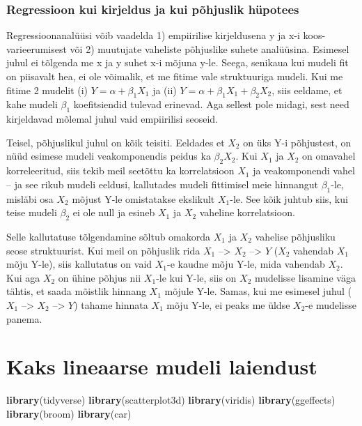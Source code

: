 \documentclass[]{book}
\newenvironment{Shaded}{\begin{snugshade}}{\end{snugshade}}
\newcommand{\KeywordTok}[1]{\textcolor[rgb]{0.13,0.29,0.53}{\textbf{#1}}}
\newcommand{\NormalTok}[1]{#1}
\begin{document}
\subsection*{Regressioon kui kirjeldus ja kui põhjuslik
hüpotees}\label{regressioon-kui-kirjeldus-ja-kui-pohjuslik-hupotees}

Regressioonanalüüsi võib vaadelda 1) empiirilise kirjeldusena y ja x-i
koos-varieerumisest või 2) muutujate vaheliste põhjuslike suhete
analüüsina. Esimesel juhul ei tõlgenda me x ja y suhet x-i mõjuna y-le.
Seega, senikaua kui mudeli fit on piisavalt hea, ei ole võimalik, et me
fitime vale struktuuriga mudeli. Kui me fitime 2 mudelit (i)
\(Y = \alpha + \beta_1X_1\) ja (ii)
\(Y = \alpha + \beta_1X_1 + \beta_2X_2\), siis eeldame, et kahe mudeli
\(\beta_1\) koefitsiendid tulevad erinevad. Aga sellest pole midagi,
sest need kirjeldavad mõlemal juhul vaid empiirilisi seoseid.

Teisel, põhjuslikul juhul on kõik teisiti. Eeldades et \(X_2\) on üks
Y-i põhjustest, on nüüd esimese mudeli veakomponendis peidus ka
\(\beta_2X_2\). Kui \(X_1\) ja \(X_2\) on omavahel korreleeritud, siis
tekib meil seetõttu ka korrelatsioon \(X_1\) ja veakomponendi vahel --
ja see rikub mudeli eeldusi, kallutades mudeli fittimisel meie hinnangut
\(\beta_1\)-le, misläbi osa \(X_2\) mõjust Y-le omistatakse ekslikult
\(X_1\)-le. See kõik juhtub siis, kui teise mudeli \(\beta_2\) ei ole
null ja esineb \(X_1\) ja \(X_2\) vaheline korrelatsioon.

Selle kallutatuse tõlgendamine sõltub omakorda \(X_1\) ja \(X_2\)
vahelise põhjusliku seose struktuurist. Kui meil on põhjuslik rida
\(X_1\) --\textgreater{} \(X_2\) --\textgreater{} \(Y\) (\(X_2\)
vahendab \(X_1\) mõju Y-le), siis kallutatus on vaid \(X_1\)-e kaudne
mõju Y-le, mida vahendab \(X_2\). Kui aga \(X_2\) on ühine põhjus nii
\(X_1\)-le kui Y-le, siis on \(X_2\) mudelisse lisamine väga tähtis, et
saada mõistlik hinnang \(X_1\) mõjule Y-le. Samas, kui me esimesel juhul
(\(X_1\) --\textgreater{} \(X_2\) --\textgreater{} \(Y\)) tahame hinnata
\(X_1\) mõju Y-le, ei peaks me üldse \(X_2\)-e mudelisse panema.

\chapter{Kaks lineaarse mudeli
laiendust}\label{kaks-lineaarse-mudeli-laiendust}

\begin{Shaded}
\begin{Highlighting}[]
\KeywordTok{library}\NormalTok{(tidyverse)}
\KeywordTok{library}\NormalTok{(scatterplot3d)}
\KeywordTok{library}\NormalTok{(viridis)}
\KeywordTok{library}\NormalTok{(ggeffects)}
\KeywordTok{library}\NormalTok{(broom)}
\KeywordTok{library}\NormalTok{(car)}
\end{Highlighting}
\end{Shaded}
\end{document}
